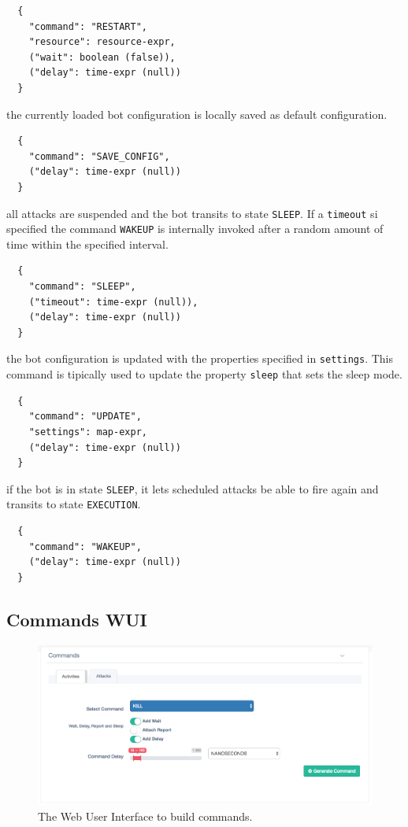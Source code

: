 \begin{description}
  \begin{verbatim}
  {
    "command": "RESTART",
    "resource": resource-expr,
    ("wait": boolean (false)),
    ("delay": time-expr (null))
  }
  \end{verbatim}

  \item[SAVE-CONFIG] the currently loaded bot configuration is locally saved as default configuration.

  \begin{verbatim}
  {
    "command": "SAVE_CONFIG",
    ("delay": time-expr (null))
  }
  \end{verbatim}

  \item[SLEEP] all attacks are suspended and the bot transits to state \texttt{SLEEP}. If a \texttt{timeout} si specified the command \texttt{WAKEUP} is internally invoked after a random amount of time within the specified interval.

  \begin{verbatim}
  {
    "command": "SLEEP",
    ("timeout": time-expr (null)),
    ("delay": time-expr (null))
  }
  \end{verbatim}

  \item[UPDATE] the bot configuration is updated with the properties specified in \texttt{settings}. This command is tipically used to update the property \texttt{sleep} that sets the sleep mode.

  \begin{verbatim}
  {
    "command": "UPDATE",
    "settings": map-expr,
    ("delay": time-expr (null))
  }
  \end{verbatim}

  \item[WAKEUP] if the bot is in state \texttt{SLEEP}, it lets scheduled attacks be able to fire again and transits to state \texttt{EXECUTION}.

  \begin{verbatim}
  {
    "command": "WAKEUP",
    ("delay": time-expr (null))
  }
  \end{verbatim}

\end{description}

\subsection{Commands WUI}
\label{sec:commands-wui}

\textcolor{green}{\lipsum[1]}

\begin{figure}[tp]
  \centering
  \includegraphics[scale=0.45]{./fig/commandsWUI.png}
  \caption{The Web User Interface to build commands.}
    \label{fig:commands-wui}
\end{figure}

\textcolor{green}{\lipsum[1]}
